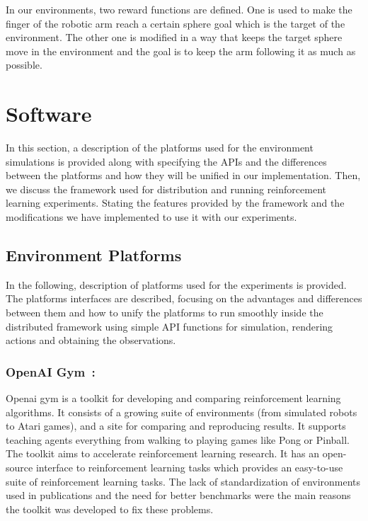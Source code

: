 In our environments, two reward functions are defined. One is used to make the finger of the robotic arm reach a certain sphere goal which is the target of the environment. The other one is modified in a way that keeps the target sphere move in the environment and the goal is to keep the arm following it as much as possible. 


\section{Software}
In this section, a description of the platforms used for the environment simulations is provided along with specifying the APIs and the differences between the platforms and how they will be unified in our implementation. Then, we discuss the framework used for distribution and running reinforcement learning experiments. Stating the features provided by the framework and the modifications we have implemented to use it with our experiments. 

\subsection{Environment Platforms}

In the following, description of platforms used for the experiments is provided. The platforms interfaces are described, focusing on the advantages and differences between them and how to unify the platforms to run smoothly inside the distributed framework using simple API functions for simulation, rendering actions and obtaining the observations.

\subsubsection{OpenAI Gym~\parencite{brockman2016openai}: } Openai gym is a toolkit for developing and comparing reinforcement learning algorithms. It consists of a growing suite of environments (from simulated robots to Atari games), and a site for comparing and reproducing results. It supports teaching agents everything from walking to playing games like Pong or Pinball. The toolkit aims to accelerate reinforcement learning research. It has an open-source interface to reinforcement learning tasks which provides an easy-to-use suite of reinforcement learning tasks. The lack of standardization of environments used in publications and the need for better benchmarks were the main reasons the toolkit was developed to fix these problems.

